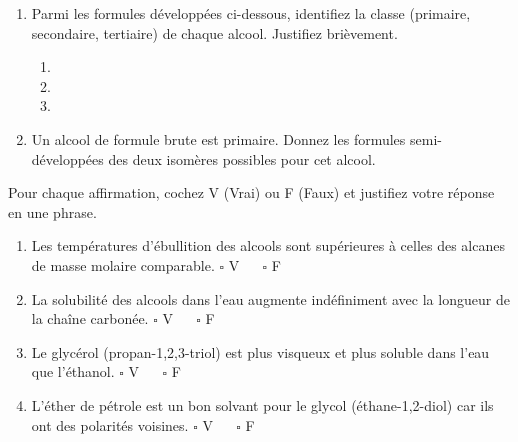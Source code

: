 \documentclass[11pt]{article}
\begin{document}
\begin{exercice}
\begin{enumerate}
    \item Parmi les formules développées ci-dessous, identifiez la classe (primaire, secondaire, tertiaire) de chaque alcool. Justifiez brièvement.
    \begin{enumerate}
        \item {}
        \item {}
        \item {}
    \end{enumerate}
    \item Un alcool de formule brute  est primaire. Donnez les formules semi-développées des deux isomères possibles pour cet alcool.
\end{enumerate}
\end{exercice}

\begin{exercice}
\noindent Pour chaque affirmation, cochez V (Vrai) ou F (Faux) et justifiez votre réponse en une phrase.
\begin{enumerate}
    \item Les températures d'ébullition des alcools sont supérieures à celles des alcanes de masse molaire comparable. \hfill $\square$ V $\quad$ $\square$ F
    \item La solubilité des alcools dans l'eau augmente indéfiniment avec la longueur de la chaîne carbonée. \hfill $\square$ V $\quad$ $\square$ F
    \item Le glycérol (propan-1,2,3-triol) est plus visqueux et plus soluble dans l'eau que l'éthanol. \hfill $\square$ V $\quad$ $\square$ F
    \item L'éther de pétrole est un bon solvant pour le glycol (éthane-1,2-diol) car ils ont des polarités voisines. \hfill $\square$ V $\quad$ $\square$ F
\end{enumerate}
\end{exercice}
\end{document}
